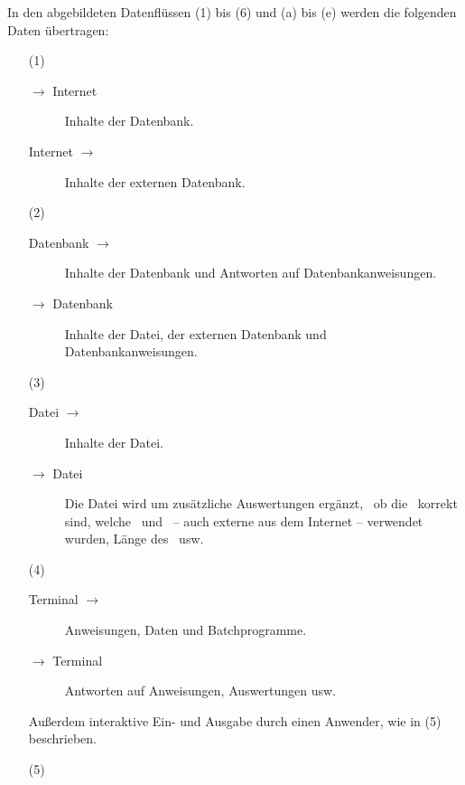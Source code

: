 In den  abgebildeten Datenflüssen (1) bis (6) und (a) bis (e) werden die folgenden Daten übertragen:
\begin{itemize}
	\newcommand*{\vonnach}  [2]{#1 $\rightarrow$ #2}
	\newcommand*{\nachvon}  [2]{\vonnach{#2}{#1}}
	\newcommand*{\hinundher}[2]{#1 $\leftrightarrow$ #2}
	\item[(1)]\label{dat-Internet}
	\begin{description}
		\item[\vonnach{\ASBA}{Internet}]\label{dat-ausInternet}
		Inhalte der Datenbank.
		\item[\nachvon{\ASBA}{Internet}]\label{dat-inInternet}
		Inhalte der externen Datenbank.
	\end{description}
	\item[(2)]\label{dat-Datenbank}
	\begin{description}
		\item[\vonnach{Datenbank}{\ASBA}]\label{dat-ausDatenbank}
		Inhalte der Datenbank und Antworten auf Datenbankanweisungen.
		\item[\nachvon{Datenbank}{\ASBA}]\label{dat-inDatenbank}
		Inhalte der Datei, der externen Datenbank und Datenbankanweisungen.
	\end{description}
	\item[(3)]\label{dat-Datei}
	\begin{description}
		\item[\vonnach{Datei}{\ASBA}]\label{dat-ausDatei}
		Inhalte der Datei.
		\item[\nachvon{Datei}{\ASBA}]\label{dat-inDatei}
		Die Datei wird um zusätzliche Auswertungen ergänzt, \textzB\ ob die \Beweise\ korrekt sind, welche \Axiome\ und \Saetze\ -- auch externe aus dem Internet -- verwendet wurden, Länge des \Beweises\ usw.
	\end{description}
	\item[(4)]\label{dat-Terminal}
	\begin{description}
		\item[\vonnach{Terminal}{\ASBA}]\label{dat-ausTerminal}
		Anweisungen, Daten und Batchprogramme.
		\item[\nachvon{Terminal}{\ASBA}]\label{dat-inTerminal}
		Antworten auf Anweisungen, Auswertungen usw.
	\end{description}
	Außerdem interaktive Ein- und Ausgabe durch einen Anwender, wie in (5) beschrieben.
	\item[(5)]\label{dat-Anwender}
	\begin{description}

\end{description}
\end{itemize}
